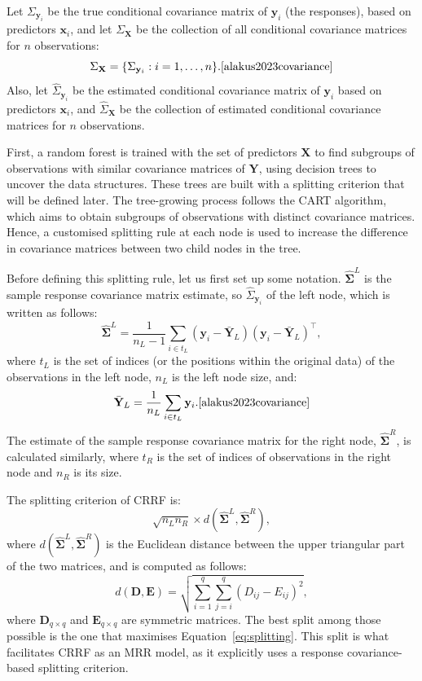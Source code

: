 \documentclass[11pt]{report} %
\begin{document}
Let \( \Sigma_{\mathbf{y}_i} \) be the true conditional covariance matrix of \( \mathbf{y}_i \) (the responses), based on predictors \( \mathbf{x}_i \), and let \( \Sigma_{\mathbf{X}} \) be the collection of all conditional covariance matrices for \( n \) observations:
\[
\Sigma_{\mathbf{X}} = \{ \Sigma_{\mathbf{y}_i} : i = 1, \dots, n \}.\cite{alakus2023covariance}
\]
Also, let \( \hat{\Sigma}_{\mathbf{y}_i} \) be the estimated conditional covariance matrix of \( \mathbf{y}_i \) based on predictors \( \mathbf{x}_i \), and \( \hat{\Sigma}_{\mathbf{X}} \) be the collection of estimated conditional covariance matrices for \( n \) observations.\cite{alakus2023covariance}

First, a random forest is trained with the set of predictors \( \mathbf{X} \) to find subgroups of observations with similar covariance matrices of \( \mathbf{Y} \), using decision trees to uncover the data structures. These trees are built with a splitting criterion that will be defined later.\cite{alakus2023covariance} The tree-growing process follows the CART algorithm, which aims to obtain subgroups of observations with distinct covariance matrices.\cite{breiman1984classification} Hence, a customised splitting rule at each node is used to increase the difference in covariance matrices between two child nodes in the tree.\cite{moradian2017l_1, tabib2020non, alakucs2021conditional, athey2019generalized}

Before defining this splitting rule, let us first set up some notation. \( \boldsymbol{\hat{\Sigma}}^{L} \) is the sample response covariance matrix estimate,  so $\hat{\Sigma}_{\mathbf{y}_i}$ of the left node, which is written as follows:
\[
\boldsymbol{\hat{\Sigma}}^{L} = \frac{1}{n_L - 1} \sum_{i \in t_L} (\mathbf{y}_i - \bar{\mathbf{Y}}_L)(\mathbf{y}_i - \bar{\mathbf{Y}}_L)^\top,
\]
where \( t_L \) is the set of indices (or the positions within the original data) of the observations in the left node, \( n_L \) is the left node size, and: 
\[
\bar{\mathbf{Y}}_L = \frac{1}{n_L} \sum_{i \in t_L} \mathbf{y}_i.\cite{alakus2023covariance}
\]
The estimate of the sample response covariance matrix for the right node, \( \boldsymbol{\hat{\Sigma}}^{R} \), is calculated similarly, where $t_R$ is the set of indices of observations in the right node and \( n_R \) is its size. 

\noindent The splitting criterion of CRRF is:
\begin{equation}
\sqrt{n_L n_R} \times d(\boldsymbol{\hat{\Sigma}}^{L}, \boldsymbol{\hat{\Sigma}}^{R}),
\label{eq:splitting}
\end{equation}
\noindent where \( d(\boldsymbol{\hat{\Sigma}}^{L}, \boldsymbol{\hat{\Sigma}}^{R}) \) is the Euclidean distance between the upper triangular part of the two matrices, and is computed as follows:
\[
d(\mathbf{D}, \mathbf{E}) = \sqrt{\sum_{i=1}^{q} \sum_{j=i}^{q} (D_{ij} - E_{ij})^2},
\]
where \( \mathbf{D}_{q \times q} \) and \( \mathbf{E}_{q \times q} \) are symmetric matrices. \cite{alakus2023covariance}
The best split among those possible is the one that maximises Equation~\ref{eq:splitting}. This split is what facilitates CRRF as an MRR model, as it explicitly uses a response covariance-based splitting criterion. 
\end{document}
